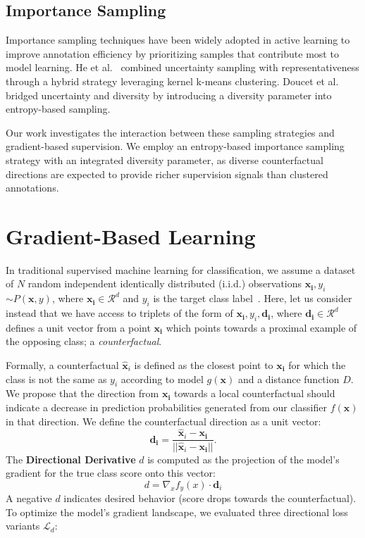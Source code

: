 \documentclass[sigconf,anonymous]{aamas}
\begin{document}
\subsection{Importance Sampling}
Importance sampling techniques have been widely adopted in active learning to improve annotation efficiency by prioritizing samples that contribute most to model learning. He et al.~\cite{he2014active} combined uncertainty sampling with representativeness through a hybrid strategy leveraging kernel k-means clustering. Doucet et al.~\cite{doucet2024bridging} bridged uncertainty and diversity by introducing a diversity parameter into entropy-based sampling.

Our work investigates the interaction between these sampling strategies and gradient-based supervision. We employ an entropy-based importance sampling strategy with an integrated diversity parameter, as diverse counterfactual directions are expected to provide richer supervision signals than clustered annotations.

\section{Gradient-Based Learning}
In traditional supervised machine learning for classification, we assume a dataset of $N$ random independent identically distributed (i.i.d.) observations {\(\mathbf{x_i}, y_i\)} $\sim P(\mathbf{x},y)$, where $\mathbf{x_i}\in\mathcal{R}^d$ and $y_i$ is the target class label~\cite{hastie2009elements}. Here, let us consider instead that we have access to triplets of the form of {\(\mathbf{x_i}, y_i, \mathbf{d_i}\)}, where $\mathbf{d_i}\in\mathcal{R}^d$ defines a unit vector from a point $\mathbf{x_i}$ which points towards a proximal example of the opposing class; a \emph{counterfactual}.

Formally, a counterfactual $\hat{\mathbf{x}}_i$ is defined as the closest point to $\mathbf{x_i}$ for which the class is not the same as $y_i$ according to model $g(\mathbf{x})$ and a distance function $D$. We propose that the direction from $\mathbf{x_i}$ towards a local counterfactual should indicate a decrease in prediction probabilities generated from our classifier $f(\mathbf{x})$ in that direction. We define the counterfactual direction as a unit vector:
\begin{equation}
    \mathbf{d_i}=\frac{\hat{\mathbf{x}}_i - \mathbf{x_i}}{||\hat{\mathbf{x}}_i - \mathbf{x_i}||}. \label{eq:dir_unit}
\end{equation}
The \textbf{Directional Derivative} $d$ is computed as the projection of the model's gradient for the true class score onto this vector:
\begin{equation}
    d = \nabla_x f_{y}(x) \cdot \mathbf{d}_{i}
\end{equation}
A negative $d$ indicates desired behavior (score drops towards the counterfactual). To optimize the model's gradient landscape, we evaluated three directional loss variants $\mathcal{L}_{d}$:
\end{document}
